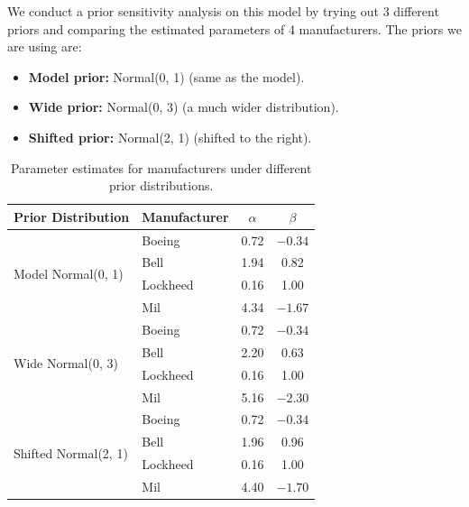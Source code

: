 \documentclass[12pt,a4paper]{article}
\begin{document}
We conduct a prior sensitivity analysis on this model by trying out 3 different priors and comparing the estimated parameters of 4 manufacturers. The priors we are using are:
\begin{itemize}
  \item \textbf{Model prior:} Normal(0, 1) (same as the model).

  \item \textbf{Wide prior:} Normal(0, 3) (a much wider distribution).

  \item \textbf{Shifted prior:} Normal(2, 1) (shifted to the right).
\end{itemize}

\begin{table}[h]
  \centering
  \begin{tabular}{llcc}
    \hline
    \textbf{Prior Distribution} & \textbf{Manufacturer} & \textbf{$\alpha$} & \textbf{$\beta$} \\
    \hline
    \multirow{4}{*}{Model Normal(0, 1)}
                                & Boeing                & 0.72              & $-0.34$          \\
                                & Bell                  & 1.94              & 0.82             \\
                                & Lockheed              & 0.16              & 1.00             \\
                                & Mil                   & 4.34              & $-1.67$          \\
    \hline
    \multirow{4}{*}{Wide Normal(0, 3)}
                                & Boeing                & 0.72              & $-0.34$          \\
                                & Bell                  & 2.20              & 0.63             \\
                                & Lockheed              & 0.16              & 1.00             \\
                                & Mil                   & 5.16              & $-2.30$          \\
    \hline
    \multirow{4}{*}{Shifted Normal(2, 1)}
                                & Boeing                & 0.72              & $-0.34$          \\
                                & Bell                  & 1.96              & 0.96             \\
                                & Lockheed              & 0.16              & 1.00             \\
                                & Mil                   & 4.40              & $-1.70$          \\
    \hline
  \end{tabular}
  \caption{Parameter estimates for manufacturers under different prior distributions.}
  \label{tab:helicopter_params}
\end{table}
\end{document}
